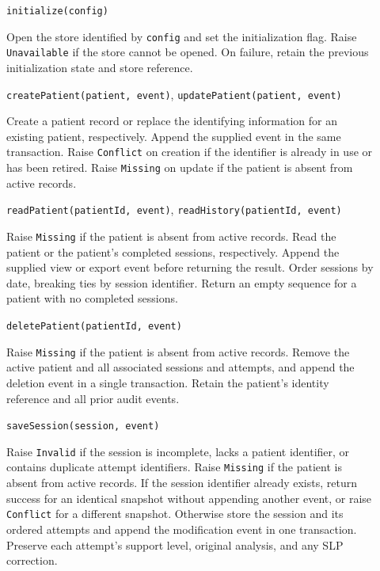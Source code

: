 \documentclass[12pt, titlepage]{article}
\begin{document}
\begin{description}
\item[] \texttt{initialize(config)}\par
Open the store identified by \texttt{config} and set the initialization flag.
Raise \texttt{Unavailable} if the store cannot be opened. On failure, retain
the previous initialization state and store reference.

\item[] \texttt{createPatient(patient, event)}, \texttt{updatePatient(patient, event)}\par
Create a patient record or replace the identifying information for an
existing patient, respectively. Append the supplied event in the same
transaction. Raise \texttt{Conflict} on creation if the identifier is
already in use or has been retired. Raise \texttt{Missing} on update if the
patient is absent from active records.

\item[] \texttt{readPatient(patientId, event)}, \texttt{readHistory(patientId, event)}\par
Raise \texttt{Missing} if the patient is absent from active records. Read
the patient or the patient's completed sessions, respectively. Append the
supplied view or export event before returning the result. Order sessions by
date, breaking ties by session identifier. Return an empty sequence for a
patient with no completed sessions.

\item[] \texttt{deletePatient(patientId, event)}\par
Raise \texttt{Missing} if the patient is absent from active records. Remove
the active patient and all associated sessions and attempts, and append the
deletion event in a single transaction. Retain the patient's identity
reference and all prior audit events.

\item[] \texttt{saveSession(session, event)}\par
Raise \texttt{Invalid} if the session is incomplete, lacks a patient
identifier, or contains duplicate attempt identifiers. Raise \texttt{Missing}
if the patient is absent from active records. If the session identifier
already exists, return success for an identical snapshot without appending
another event, or raise \texttt{Conflict} for a different snapshot. Otherwise
store the session and its ordered attempts and append the modification event
in one transaction. Preserve each attempt's support level, original analysis,
and any SLP correction.


\end{description}
\end{document}
